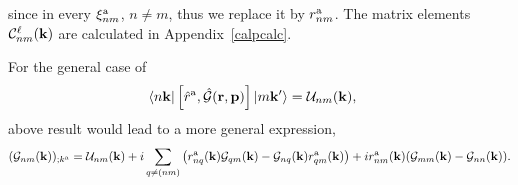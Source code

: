 since in every $\xi_{nm}^{\mathrm{a}}$, $n\ne m$, thus we replace it by $r^{\mathrm{a}}_{nm}$. 
The matrix elements ${\mathbf{\cal C}}^\ell_{nm}(\mathbf{k})$ are calculated in Appendix~\ref{calpcalc}. 

For the general
case of
\begin{align}\label{a.8}
\langle n\mathbf{k} |
\left[\hat r^{\mathrm{a}},\hat{{\mathbf{\cal G}}}(\mathbf{r},\mathbf{p})\right]
| m\mathbf{k}' \rangle
&=
{\cal U}_{nm}(\mathbf{k})
,
\end{align}
above result would lead to a more general expression, 
\begin{align}\label{a.9}
({\mathbf{\cal G}}_{nm}(\mathbf{k}))_{;k^{\mathrm{a}}}
&=
{\cal U}_{nm}(\mathbf{k})
+
i\sum_{q\ne(nm)}
\left(
r_{nq}^{\mathrm{a}} (\mathbf{k})
{\mathbf{\cal G}}_{qm}(\mathbf{k})
-
{\mathbf{\cal G}}_{nq}(\mathbf{k})
r_{qm}^{\mathrm{a}} (\mathbf{k})
\right)
+ir_{nm}^{\mathrm{a}} (\mathbf{k}) ({\mathbf{\cal G}}_{mm}(\mathbf{k})-{\mathbf{\cal G}}_{nn}(\mathbf{k}))
.
\nonumber\\
\end{align}
